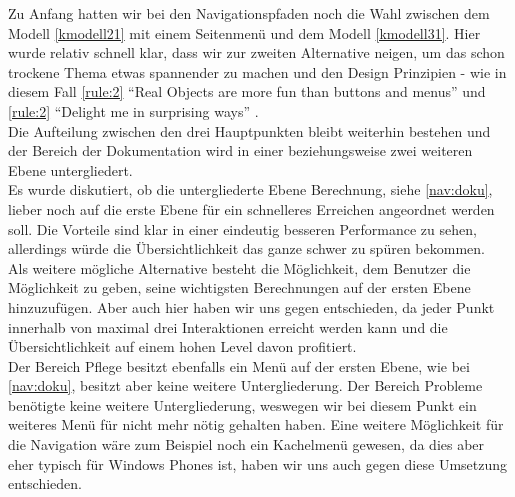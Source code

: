 Zu Anfang hatten wir bei den Navigationspfaden noch die Wahl zwischen dem Modell \ref{kmodell21} mit einem Seitenmenü und dem Modell \ref{kmodell31}. Hier wurde relativ schnell klar, dass wir zur zweiten Alternative neigen, um das schon trockene Thema etwas spannender zu machen und den Design Prinzipien - wie in diesem Fall \ref {rule:2} "`Real Objects are more fun than buttons and menus"' und \ref{rule:2} "`Delight me in surprising ways"' . \\
Die Aufteilung zwischen den drei Hauptpunkten bleibt weiterhin bestehen und der Bereich der Dokumentation wird in einer beziehungsweise zwei weiteren Ebene untergliedert. \\
Es wurde diskutiert, ob die untergliederte Ebene Berechnung, siehe \ref{nav:doku}, lieber noch auf die erste Ebene für ein schnelleres Erreichen angeordnet werden soll. Die Vorteile sind klar in einer eindeutig besseren Performance zu sehen, allerdings würde die Übersichtlichkeit das ganze schwer zu spüren bekommen.
\\Als weitere mögliche Alternative besteht die Möglichkeit, dem Benutzer die Möglichkeit zu geben, seine wichtigsten Berechnungen auf der ersten Ebene hinzuzufügen. Aber auch hier haben wir uns gegen entschieden, da jeder Punkt innerhalb von maximal drei Interaktionen erreicht werden kann und die Übersichtlichkeit auf einem hohen Level davon profitiert.\\

Der Bereich Pflege besitzt ebenfalls ein Menü auf der ersten Ebene, wie bei \ref{nav:doku}, besitzt aber keine weitere Untergliederung. Der Bereich Probleme benötigte keine weitere Untergliederung, weswegen wir bei diesem Punkt ein weiteres Menü für nicht mehr nötig gehalten haben. Eine weitere Möglichkeit für die Navigation wäre zum Beispiel noch ein Kachelmenü gewesen, da dies aber eher typisch für Windows Phones ist, haben wir uns auch gegen diese Umsetzung entschieden.

